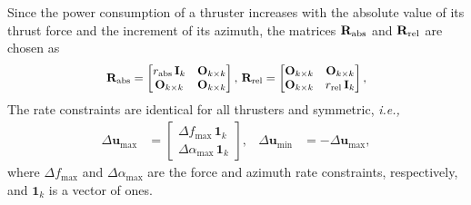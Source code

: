 \noindent Since the power consumption of a thruster increases with the absolute value of its thrust force and the increment of its azimuth, the matrices $\mathbf{R}_{\rm abs}$ and $\mathbf{R}_{\rm rel}$ are chosen as
\begin{equation}
    \scale[0.931]{\mathbf{R}_{\rm abs} = \begin{bmatrix} r_{\rm abs}\,\mathbf{I}_{k} & \mathbf{O}_{k \times k} \\ \mathbf{O}_{k \times k} & \mathbf{O}_{k \times k} \end{bmatrix}, \,
    \mathbf{R}_{\rm rel} = \begin{bmatrix} \mathbf{O}_{k \times k} & \mathbf{O}_{k \times k} \\ \mathbf{O}_{k \times k} & r_{\rm rel}\,\mathbf{I}_{k} \end{bmatrix},}
\end{equation}
The rate constraints are identical for all thrusters and symmetric, \emph{i.e.,}
\begin{align}
    \Delta\mathbf{u}_{\max} &= \begin{bmatrix} \Delta f_{\max}\,\mathbf{1}_k \\ \Delta \alpha_{\max}\,\mathbf{1}_k \end{bmatrix}, &
    \Delta\mathbf{u}_{\min} &= - \Delta\mathbf{u}_{\max},
\end{align}
where $\Delta f_{\max}$ and $\Delta \alpha_{\max}$ are the force and azimuth rate constraints, respectively, and $\mathbf{1}_k$ is a vector of ones.


